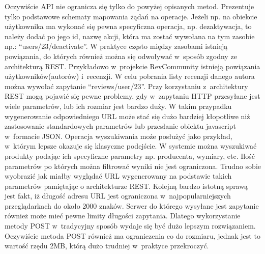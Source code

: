 Oczywiście API nie ogranicza się tylko do powyżej opisanych metod. Prezentuje tylko podstawowe schematy mapowania żądań na operacje. Jeżeli np. na obiekcie użytkownika ma wykonać się pewna specyficzna operacja, np. dezaktywacja, to należy dodać po jego id, nazwę akcji, która ma zostać wywołana na tym zasobie np.: “users/23/deactivate”. 
W praktyce często między zasobami istnieją powiązania, do których również można się odwoływać w~sposób zgodny ze architekturą REST. Przykładowo w~projekcie RevCommunity istnieją powiązania użytkowników(autorów) i~recenzji. W celu pobrania listy recenzji danego autora można wywołać zapytanie “reviews/user/23”.
Przy korzystaniu z~architektury REST mogą pojawić się pewne problemy, gdy w~zapytaniu HTTP  przesyłane jest wiele parametrów, lub ich rozmiar jest bardzo duży. W takim przypadku wygenerowanie odpowiedniego URL może stać się dużo bardziej kłopotliwe niż zastosowanie standardowych parametrów lub przesłanie obiektu javascript w~formacie JSON. Operacja wyszukiwania może posłużyć jako przykład, w~którym lepsze okazuje się klasyczne podejście. W systemie można wyszukiwać produkty podając ich specyficzne parametry np. producenta, wymiary, etc. Ilość parametrów po których można filtrować wyniki nie jest ograniczona. Trudno sobie wyobrazić jak miałby wyglądać URL wygenerowany na podstawie takich parametrów pamiętając o architekturze REST. Kolejną bardzo istotną sprawą jest fakt, iż długość adresu URL jest ograniczona w~najpopularniejszych przeglądarkach do około 2000 znaków. Serwer do którego wysyłane jest zapytanie również może mieć pewne limity długości zapytania. Dlatego wykorzystanie metody POST w~tradycyjny sposób wydaje się być dużo lepszym rozwiązaniem. Oczywiście metoda POST również ma ograniczenia co do rozmiaru, jednak jest to wartość rzędu 2MB, którą dużo trudniej w~praktyce przekroczyć\cite{restWww}.

